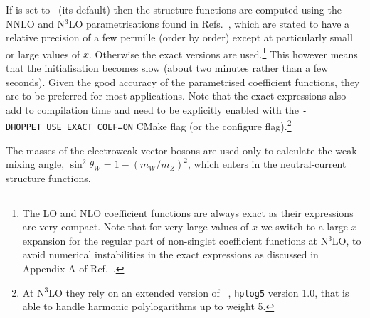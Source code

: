 
If  is set to \ (its default) then the
structure functions are computed using the NNLO and N$^3$LO
parametrisations found in
Refs.~\cite{vanNeerven:1999ca,vanNeerven:2000uj,Moch:2004xu,Vermaseren:2005qc,Moch:2008fj,Davies:2016ruz},
which are stated to have a relative precision of a few permille (order
by order) except at particularly small or large values of $x$.
%
Otherwise the exact versions are used.\footnote{The LO and NLO
coefficient functions are always exact as their expressions are very
compact. Note that for very large values of $x$ we switch to a
large-$x$ expansion for the regular part of non-singlet coefficient
functions at N$^3$LO, to avoid numerical instabilities in the exact
expressions as discussed in Appendix A of
Ref.~\cite{Bertone:2024dpm}.}
%
This however means that the initialisation becomes slow (about two
minutes rather than a few seconds).
%
Given the good accuracy of the parametrised coefficient functions,
they are to be preferred for most applications.
% 
% 
Note that the exact expressions also add to compilation time and need
to be explicitly enabled with the \texttt{-DHOPPET\_USE\_EXACT\_COEF=ON}
CMake flag (or the  configure
flag).\footnote{At N$^3$LO they rely on an extended version of
  ~\cite{FortranPolyLog}, \texttt{hplog5} version 1.0, that
  is able to handle harmonic polylogarithms up to weight 5.}

The masses of the electroweak vector bosons are used only to calculate
the weak mixing angle, $\sin^2 \theta_W = 1 - (m_W/m_Z)^2$, which
enters in the neutral-current structure functions.


